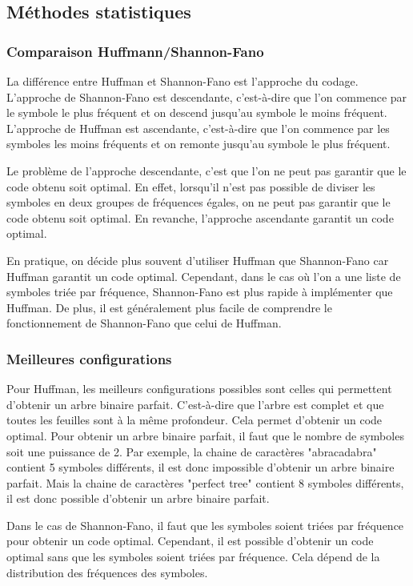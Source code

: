 \subsection{Méthodes statistiques}

    \subsubsection{Comparaison Huffmann/Shannon-Fano}

    La différence entre Huffman et Shannon-Fano est l'approche du codage. L'approche de Shannon-Fano est descendante, c'est-à-dire que l'on commence par le symbole le plus fréquent et on descend jusqu'au symbole le moins fréquent. L'approche de Huffman est ascendante, c'est-à-dire que l'on commence par les symboles les moins fréquents et on remonte jusqu'au symbole le plus fréquent.

    \medskip

    Le problème de l'approche descendante, c'est que l'on ne peut pas garantir que le code obtenu soit optimal. En effet, lorsqu'il n'est pas possible de diviser les symboles en deux groupes de fréquences égales, on ne peut pas garantir que le code obtenu soit optimal. En revanche, l'approche ascendante garantit un code optimal.

    \medskip

    En pratique, on décide plus souvent d'utiliser Huffman que Shannon-Fano car Huffman garantit un code optimal. Cependant, dans le cas où l'on a une liste de symboles triée par fréquence, Shannon-Fano est plus rapide à implémenter que Huffman. De plus, il est généralement plus facile de comprendre le fonctionnement de Shannon-Fano que celui de Huffman.

    \subsubsection{Meilleures configurations}

    Pour Huffman, les meilleurs configurations possibles sont celles qui permettent d'obtenir un arbre binaire parfait. C'est-à-dire que l'arbre est complet et que toutes les feuilles sont à la même profondeur. Cela permet d'obtenir un code optimal. Pour obtenir un arbre binaire parfait, il faut que le nombre de symboles soit une puissance de 2. Par exemple, la chaine de caractères "abracadabra" contient 5 symboles différents, il est donc impossible d'obtenir un arbre binaire parfait. Mais la chaine de caractères "perfect tree" contient 8 symboles différents, il est donc possible d'obtenir un arbre binaire parfait.

    Dans le cas de Shannon-Fano, il faut que les symboles soient triées par fréquence pour obtenir un code optimal. Cependant, il est possible d'obtenir un code optimal sans que les symboles soient triées par fréquence. Cela dépend de la distribution des fréquences des symboles.